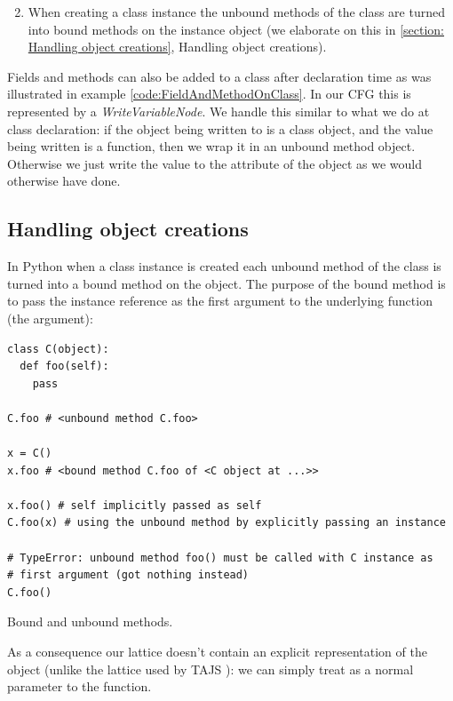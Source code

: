\begin{enumerate}
\setcounter{enumi}{1}
	\item When creating a class instance the unbound methods of the class are turned into bound methods on the instance object (we elaborate on this in \autoref{section: Handling object creations}, Handling object creations).
\end{enumerate}

Fields and methods can also be added to a class after declaration time as was illustrated in example \ref{code:FieldAndMethodOnClass}. In our CFG this is represented by a \textit{WriteVariableNode}. We handle this similar to what we do at class declaration: if the object being written to is a class object, and the value being written is a function, then we wrap it in an unbound method object. Otherwise we just write the value to the attribute of the object as we would otherwise have done.


\subsection{Handling object creations}
\label{section: Handling object creations}
In Python when a class instance is created each unbound method of the class is turned into a bound method on the object. The purpose of the bound method is to pass the instance reference as the first argument to the underlying function (the  argument):

\begin{listing}[H]
	\begin{verbatim}
class C(object):
  def foo(self):
    pass

C.foo # <unbound method C.foo>

x = C()
x.foo # <bound method C.foo of <C object at ...>>

x.foo() # self implicitly passed as self
C.foo(x) # using the unbound method by explicitly passing an instance

# TypeError: unbound method foo() must be called with C instance as 
# first argument (got nothing instead)
C.foo()
	\end{verbatim}
	\caption{Bound and unbound methods.}
	\label{code:BoundAndUnboundMethodsOnClass}
\end{listing}

As a consequence our lattice doesn't contain an explicit representation of the  object (unlike the lattice used by TAJS \cite{tajs}): we can simply treat  as a normal parameter to the function.

